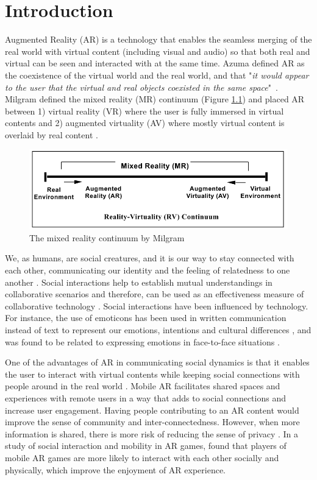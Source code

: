\chapter{Introduction}
\label{ch:intro}

Augmented Reality (AR) is a technology that enables the seamless merging of the real world with virtual content (including visual and audio) so that both real and virtual can be seen and interacted with at the same time. Azuma defined AR as the coexistence of the virtual world and the real world, and that "\textit{it would appear to the user that the virtual and real objects coexisted in the same space}"~\cite{azuma1997survey}. Milgram defined the mixed reality (MR) continuum (Figure \ref{fig:mr-continuum}) and placed AR between 1) virtual reality (VR) where the user is fully immersed in virtual contents and 2) augmented virtuality (AV) where mostly virtual content is overlaid by real content \cite{Milgram1995a}. 

\begin{figure}
    \centering
    \includegraphics[width=0.8\linewidth]{images/mixed-reality-continuum.png}
    \caption{The mixed reality continuum by Milgram \cite{Milgram1995a}}
    \label{fig:mr-continuum}
\end{figure}

We, as humans, are social creatures, and it is our way to stay connected with each other, communicating our identity and the feeling of relatedness to one another \cite{HuangWeidong2013}. Social interactions help to establish mutual understandings in collaborative scenarios and therefore, can be used as an effectiveness measure of collaborative technology \cite{Li2013}. Social interactions have been influenced by technology. For instance, the use of emoticons has been used in written communication instead of text to represent our emotions, intentions and cultural differences \cite{Pavalanathan2016}, and was found to be related to expressing emotions in face-to-face situations \cite{Derks2007}. 

One of the advantages of AR in communicating social dynamics is that it enables the user to interact with virtual contents while keeping social connections with people around in the real world \cite{HuangWeidong2013}. Mobile AR facilitates shared spaces and experiences with remote users in a way that adds to social connections and increase user engagement. Having people contributing to an AR content would improve the sense of community and inter-connectedness. However, when more information is shared, there is more risk of reducing the sense of privacy \cite{Olsson2013}. In a study of social interaction and mobility in AR games, \textcite{Schmalstieg_144} found that players of mobile AR games are more likely to interact with each other socially and physically, which improve the enjoyment of AR experience. 

